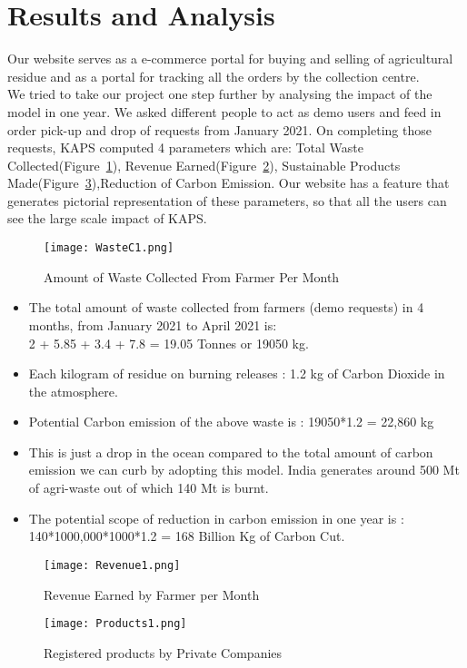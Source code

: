\documentclass[conference]{IEEEtran}
\begin{document}
\section{Results and Analysis}
Our website serves as a e-commerce portal for buying and selling of agricultural residue and as a portal for tracking all the orders by the collection centre.\\ We tried to take our project one step further by analysing the impact of the model in one year. We asked different people to act as demo users and feed in order pick-up and drop of requests from January 2021. On completing those requests, KAPS computed 4 parameters which are: Total Waste Collected(Figure~\ref{fig:z}), Revenue Earned(Figure~\ref{fig:y}), Sustainable Products Made(Figure~\ref{fig:x}),Reduction of Carbon Emission. Our website has a feature that generates pictorial representation of these parameters, so that all the users can see the large scale impact of KAPS. 
\begin{figure}[htbp]
\centerline{\texttt{[image: WasteC1.png]}}
\caption{Amount of Waste Collected From Farmer Per Month}
\label{fig:z}
\end{figure}
\begin{itemize}
    \item The total amount of waste collected from farmers (demo requests) in 4 months, from January 2021 to April 2021 is: \\
    2 + 5.85 + 3.4 + 7.8 = 19.05 Tonnes or 19050 kg.
    \item Each kilogram of residue on burning releases : 1.2 kg of Carbon Dioxide in the atmosphere.
    \item Potential Carbon emission of the above waste is : 19050*1.2 = 22,860 kg
    \item This is just a drop in the ocean compared to the total amount of carbon emission we can curb by adopting this model. India generates around 500 Mt of agri-waste out of which 140 Mt is burnt. 
    \item The potential scope of reduction in carbon emission in one year is : 140*1000,000*1000*1.2 = 168 Billion Kg of Carbon Cut.
\end{itemize}
\begin{figure}[htbp]
\centerline{\texttt{[image: Revenue1.png]}}
\caption{Revenue Earned by Farmer per Month}
\label{fig:y}
\end{figure}
\begin{figure}[htbp]
\centerline{\texttt{[image: Products1.png]}}
\caption{Registered products by Private Companies}
\label{fig:x}
\end{figure}
\end{document}
